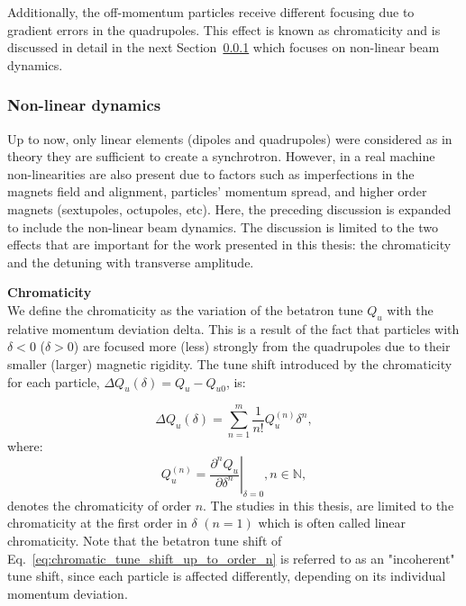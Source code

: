 Additionally, the off-momentum particles receive different focusing due to gradient errors in the quadrupoles. This effect is known as chromaticity and is discussed in detail in the next Section~\ref{subsec:non-liner_beam_dynamics} which focuses on non-linear beam dynamics.

\subsubsection{Non-linear dynamics}\label{subsec:non-liner_beam_dynamics}
Up to now, only linear elements (dipoles and quadrupoles) were considered as in theory they are sufficient to create a synchrotron. However, in a real machine non-linearities are also present due to factors such as imperfections in the magnets field and alignment, particles' momentum spread, and higher order magnets (sextupoles, octupoles, etc). Here, the preceding discussion is expanded to include the non-linear beam dynamics. The discussion is limited to the two effects that are important for the work presented in this thesis: the chromaticity and the detuning with transverse amplitude.

\textbf{Chromaticity}\\
We define the chromaticity as the variation of the betatron tune $Q_u$ with the relative momentum deviation delta. This is a result of the fact that particles with $\delta < 0$ ($\delta > 0$) are focused more (less) strongly from the quadrupoles due to their smaller (larger) magnetic rigidity. The tune shift introduced by the chromaticity for each particle, $ \Delta Q_u (\delta)= Q_u - Q_{u0}$, is: %


\begin{equation}\label{eq:chromatic_tune_shift_up_to_order_n}
   \Delta Q_u (\delta) = \sum_{n=1}^m \frac{1}{n!} Q_u^{(n)} \delta^n, 
\end{equation}
where:
\begin{equation}\label{eq:chroma_up_to_order_m}
    Q_u^{(n)} = \left. \frac{\partial ^n Q_u}{\partial \delta^n} \right|_{\delta=0}, n \in \mathbb{N},
 \end{equation}
denotes the chromaticity of order $n$. The studies in this thesis, are limited to the chromaticity at the first order in $\delta$ $(n=1)$ which is often called linear chromaticity. Note that the betatron tune shift of Eq.~\eqref{eq:chromatic_tune_shift_up_to_order_n} is referred to as an "incoherent" tune shift, since each particle is affected differently, depending on its individual momentum deviation.

